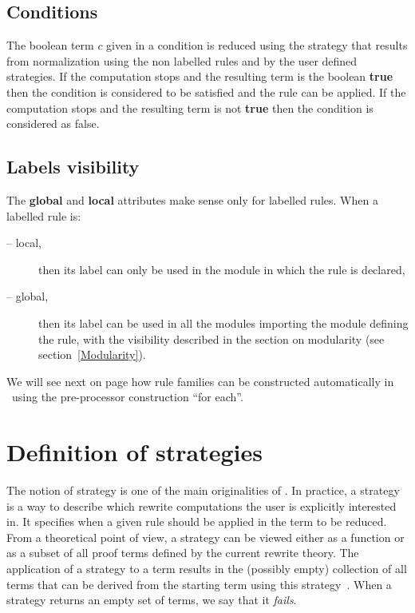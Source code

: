 \subsection{Conditions}

The boolean term $c$ given in a condition is reduced using the
strategy that results from normalization using the non labelled rules
and by the user defined strategies. If the computation stops and the
resulting term is the boolean {\bf true} then the condition is
considered to be satisfied and the rule can be applied. If the
computation stops and the resulting term is not {\bf true} then the
condition is considered as false.

\subsection{Labels visibility}

The {\bf global} and {\bf local} attributes make sense only for
labelled rules. When a labelled rule is:
\begin{description}
\item[-- local,] then its label can only be used in the module in which
  the rule is declared,
\item[-- global,] then its label can be used in all the modules importing
  the module defining the rule, with the visibility described in the
  section on modularity (see section~\ref{Modularity}).
\end{description}



\REM 
We will see next on page \pageref{for each} how rule families can
be constructed automatically in \elan\ using the pre-processor
construction ``{\sc for each}''.

\FREM

\section{Definition of strategies}\label{Definition of strategies}

The notion of strategy is one of the main originalities of \elan.
In practice, a strategy is a way to describe which rewrite
computations the user is explicitly interested in. It specifies when a
given rule should be applied in the term to be reduced.  From a
theoretical point of view, a strategy can be viewed either as a
function or as a subset of all proof terms defined by the current
rewrite theory. The application of a strategy to a term results in the
(possibly empty) collection of all terms that can be derived from the
starting term using this strategy~\cite{KirchnerKV-MIT95,VittekThese}.
When a strategy returns an empty set of terms, we say that it {\em
fails}.


